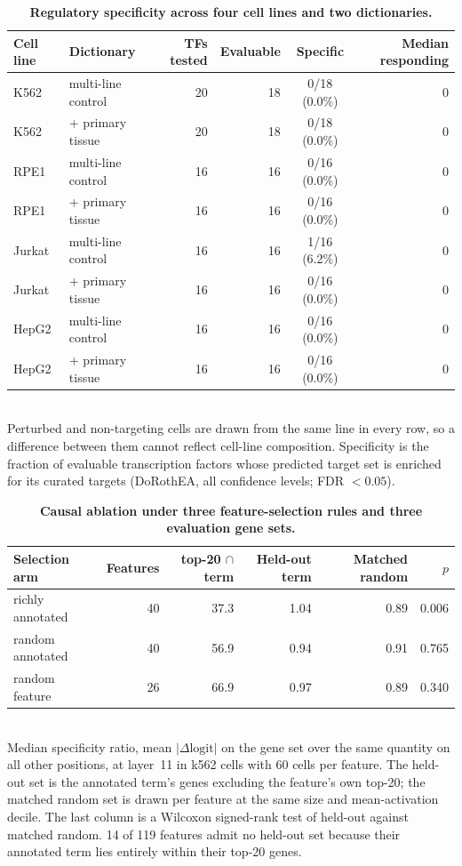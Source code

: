 \documentclass[11pt]{article}
\begin{document}
\begin{table}[htbp]
\centering
\caption{\textbf{Regulatory specificity across four cell lines and two dictionaries.}}
\label{tab:crossline}
\smallskip
\small
\begin{tabular}{llrrcr}
\toprule
Cell line & Dictionary & TFs tested & Evaluable & Specific & Median responding \\
\midrule
K562 & multi-line control & 20 & 18 & 0/18 (0.0\%) & 0 \\
K562 & + primary tissue & 20 & 18 & 0/18 (0.0\%) & 0 \\
RPE1 & multi-line control & 16 & 16 & 0/16 (0.0\%) & 0 \\
RPE1 & + primary tissue & 16 & 16 & 0/16 (0.0\%) & 0 \\
Jurkat & multi-line control & 16 & 16 & 1/16 (6.2\%) & 0 \\
Jurkat & + primary tissue & 16 & 16 & 0/16 (0.0\%) & 0 \\
HepG2 & multi-line control & 16 & 16 & 0/16 (0.0\%) & 0 \\
HepG2 & + primary tissue & 16 & 16 & 0/16 (0.0\%) & 0 \\
\bottomrule
\end{tabular}
\\[2pt]
\footnotesize Perturbed and non-targeting cells are drawn from the same line in every row, so a difference between them cannot reflect cell-line composition. Specificity is the fraction of evaluable transcription factors whose predicted target set is enriched for its curated targets (DoRothEA, all confidence levels; FDR $< 0.05$).
\end{table}

\begin{table}[htbp]
\centering
\caption{\textbf{Causal ablation under three feature-selection rules and three evaluation gene sets.}}
\label{tab:causal_arms}
\smallskip
\small
\begin{tabular}{lrrrrr}
\toprule
Selection arm & Features & top-20 $\cap$ term & Held-out term & Matched random & $p$ \\
\midrule
richly annotated & 40 & 37.3 & 1.04 & 0.89 & 0.006 \\
random annotated & 40 & 56.9 & 0.94 & 0.91 & 0.765 \\
random feature & 26 & 66.9 & 0.97 & 0.89 & 0.340 \\
\bottomrule
\end{tabular}
\\[2pt]
\footnotesize Median specificity ratio, mean $|\Delta\text{logit}|$ on the gene set over the same quantity on all other positions, at layer~11 in k562 cells with 60 cells per feature. The held-out set is the annotated term's genes excluding the feature's own top-20; the matched random set is drawn per feature at the same size and mean-activation decile. The last column is a Wilcoxon signed-rank test of held-out against matched random. 14 of 119 features admit no held-out set because their annotated term lies entirely within their top-20 genes.
\end{table}
\end{document}
